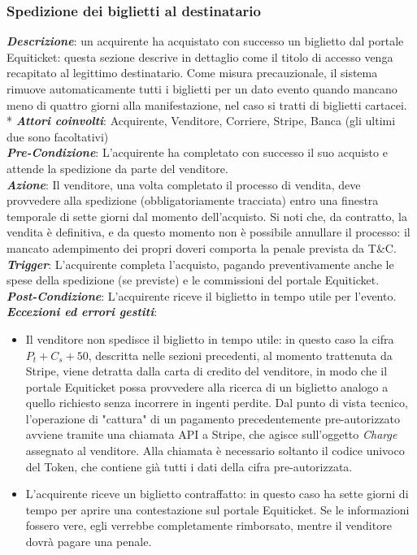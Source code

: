 \subsubsection{Spedizione dei biglietti al destinatario}
\textbf{\textit{Descrizione}}: un acquirente ha acquistato con successo un biglietto dal portale Equiticket: questa sezione descrive in dettaglio come il titolo di accesso venga recapitato al legittimo destinatario. 
Come misura precauzionale, il sistema rimuove automaticamente tutti i biglietti per un dato evento quando mancano meno di quattro giorni alla manifestazione, nel caso si tratti di biglietti cartacei. \\*
\textbf{\textit{Attori coinvolti}}: Acquirente, Venditore, Corriere, Stripe, Banca (gli ultimi due sono facoltativi) \\
\textbf{\textit{Pre-Condizione}}: L'acquirente ha completato con successo il suo acquisto e attende la spedizione da parte del venditore. \\
\textbf{\textit{Azione}}: Il venditore, una volta completato il processo di vendita, deve provvedere alla spedizione (obbligatoriamente tracciata) entro una finestra temporale di sette giorni dal momento dell'acquisto. Si noti che, da contratto, la vendita è definitiva, e da questo momento non è possibile annullare il processo: il mancato adempimento dei propri doveri comporta la penale prevista da T\&C.\\
\textbf{\textit{Trigger}}: L'acquirente completa l'acquisto, pagando preventivamente anche le spese della spedizione (se previste) e le commissioni del portale Equiticket. \\
\textbf{\textit{Post-Condizione}}: L'acquirente riceve il biglietto in tempo utile per l'evento. \\
\textbf{\textit{Eccezioni ed errori gestiti}}: 
\begin{itemize}
	\item Il venditore non spedisce il biglietto in tempo utile: in questo caso la cifra $P_{t} + C_{s} + 50$,  descritta nelle sezioni precedenti, al momento trattenuta da Stripe, viene detratta dalla carta di 		credito del venditore, in modo che il portale Equiticket possa provvedere alla ricerca di un biglietto analogo a quello richiesto senza incorrere in ingenti perdite.
	Dal punto di vista tecnico, l'operazione di "cattura" di un pagamento precedentemente pre-autorizzato avviene tramite una chiamata API a Stripe, che agisce sull'oggetto \textit{Charge} assegnato al venditore. Alla chiamata è necessario soltanto il codice univoco del Token, che contiene già tutti i dati della cifra pre-autorizzata. 
	\item L'acquirente riceve un biglietto contraffatto: in questo caso ha sette giorni di tempo per aprire una contestazione sul portale Equiticket. Se le informazioni fossero vere, egli verrebbe completamente rimborsato, mentre il venditore dovrà pagare una penale. 
\end{itemize}
